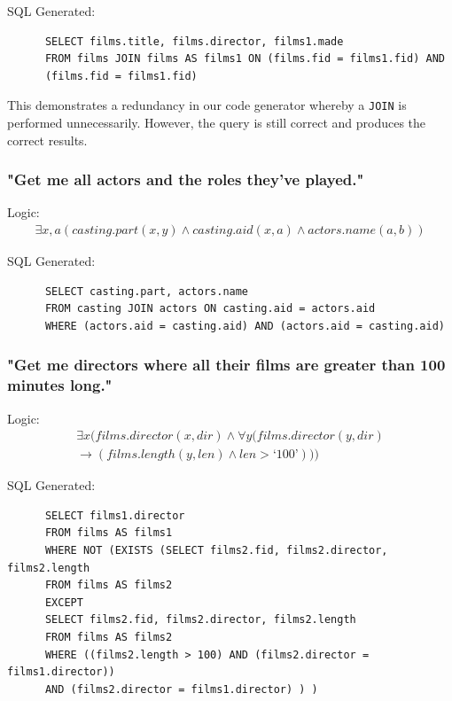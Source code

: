 \documentclass[a4paper, 11pt]{article}
\begin{document}
      SQL Generated:
      \begin{verbatim}
      SELECT films.title, films.director, films1.made
      FROM films JOIN films AS films1 ON (films.fid = films1.fid) AND
      (films.fid = films1.fid)
      \end{verbatim}

      This demonstrates a redundancy in our code generator whereby a
      \texttt{JOIN} is performed unnecessarily. However, the query is still
      correct and produces the correct results.

    \subsubsection*{"Get me all actors and the roles they've played."}

      Logic:
      \begin{gather}
        \exists x,a(casting.part(x, y) \land casting.aid(x, a) \land actors.name(a, b))
      \end{gather}

      SQL Generated:
      \begin{verbatim}
      SELECT casting.part, actors.name
      FROM casting JOIN actors ON casting.aid = actors.aid
      WHERE (actors.aid = casting.aid) AND (actors.aid = casting.aid)
      \end{verbatim}

    \subsubsection*{"Get me directors where all their films are greater than 100
      minutes long."}

      Logic:
      \begin{multline}
        \exists x(films.director(x, dir) \land \forall y(films.director(y, dir)
        \\
        \to (films.length(y, len) \land len > \text{`100'})))
      \end{multline}

      SQL Generated:
      \begin{verbatim}
      SELECT films1.director
      FROM films AS films1
      WHERE NOT (EXISTS (SELECT films2.fid, films2.director, films2.length
      FROM films AS films2
      EXCEPT
      SELECT films2.fid, films2.director, films2.length
      FROM films AS films2
      WHERE ((films2.length > 100) AND (films2.director = films1.director))
      AND (films2.director = films1.director) ) )
      \end{verbatim}
\end{document}
